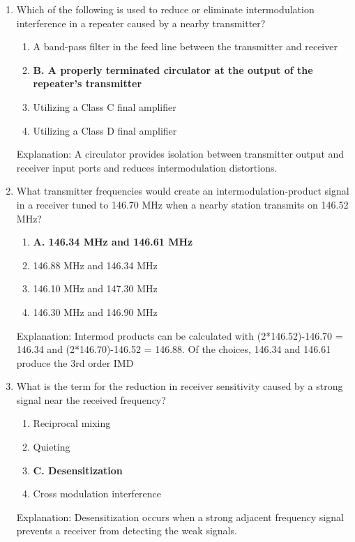 \begin{enumerate}
   \item Which of the following is used to reduce or eliminate intermodulation interference in a repeater caused by a nearby transmitter?
        \begin{enumerate}
           \item  A band-pass filter in the feed line between the transmitter and receiver
        \item \textbf{B. A properly terminated circulator at the output of the repeater's transmitter}
       \item  Utilizing a Class C final amplifier
          \item  Utilizing a Class D final amplifier
        \end{enumerate}
        \textcolor{myred}{Explanation:}
     A circulator provides isolation between transmitter output and receiver input ports and reduces intermodulation distortions.
        
     \item What transmitter frequencies would create an intermodulation-product signal in a receiver tuned to 146.70 MHz when a nearby station transmits on 146.52 MHz?
       \begin{enumerate}
       \item \textbf{A. 146.34 MHz and 146.61 MHz}
    \item  146.88 MHz and 146.34 MHz
     \item  146.10 MHz and 147.30 MHz
     \item  146.30 MHz and 146.90 MHz
     \end{enumerate}
       \textcolor{myred}{Explanation:}
   Intermod products can be calculated with (2*146.52)-146.70 = 146.34 and (2*146.70)-146.52 = 146.88.  Of the choices, 146.34 and 146.61 produce the 3rd order IMD
        
       \item What is the term for the reduction in receiver sensitivity caused by a strong signal near the received frequency?
         \begin{enumerate}
        \item  Reciprocal mixing
       \item  Quieting
       \item \textbf{C. Desensitization}
        \item  Cross modulation interference
       \end{enumerate}
         \textcolor{myred}{Explanation:}
       Desensitization occurs when a strong adjacent frequency signal prevents a receiver from detecting the weak signals.


\end{enumerate}
